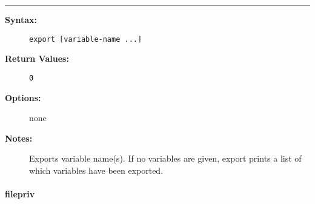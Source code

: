 \hrule
\begin{description}
\item[{\bf Syntax:}] \mbox{}

{\tt export [variable-name ...]}

\item[{\bf Return Values:}] \mbox{}

\begin{description}
\item[{\tt 0}] \mbox{}



\end{description}


\item[{\bf Options:}] \mbox{}

none  

\item[{\bf Notes:}] \mbox{}

Exports variable name(s). If no variables are given, 
export prints a list of which variables have been exported.

\end{description}


\vspace {2pt}


\paragraph{filepriv}

